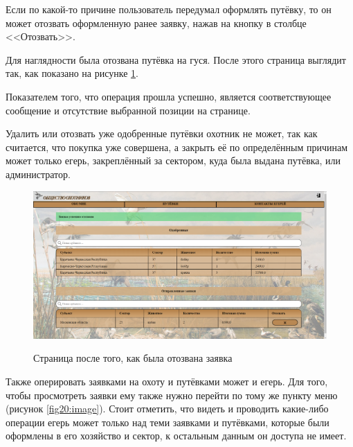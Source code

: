 	Если по какой-то причине пользователь передумал оформлять путёвку, то он может отозвать оформленную ранее заявку, нажав на кнопку в столбце <<Отозвать>>. 
	
	Для наглядности была отозвана путёвка на гуся. После этого страница выглядит так, как показано на рисунке \ref{fig19:image}. 
	
	Показателем того, что операция прошла успешно, является соответствующее сообщение и отсутствие выбранной позиции на странице. 
	
	Удалить или отозвать уже одобренные путёвки охотник не может, так как считается, что покупка уже совершена, а закрыть её по определённым причинам может только егерь, закреплённый за сектором, куда была выдана путёвка, или администратор.
	
	\begin{figure}[pt!]
		\centering
		\begin{center}
			{\includegraphics[scale=0.34]{schemes/screens/after_del_huntsman.png}}
			\caption{Страница после того, как была отозвана заявка}
			\label{fig19:image}
		\end{center}
	\end{figure}
	\newpage

	Также оперировать заявками на охоту и путёвками может и егерь. Для того, чтобы просмотреть заявки ему также нужно перейти по тому же пункту меню (рисунок \ref{fig20:image}). Стоит отметить, что видеть и проводить какие-либо операции егерь может только над теми заявками и путёвками, которые были оформлены в его хозяйство и сектор, к остальным данным он доступа не имеет.
	
